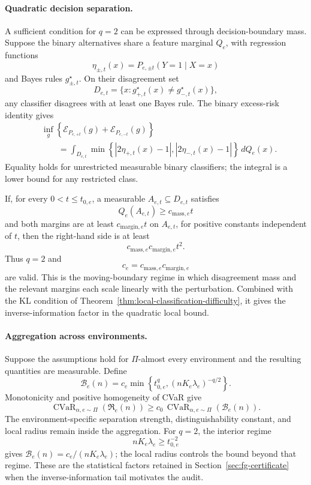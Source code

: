 \paragraph{Quadratic decision separation.}

A sufficient condition for \(q=2\) can be expressed through decision-boundary mass. Suppose the binary alternatives share a feature marginal \(Q_e\), with regression functions
\[
\eta_{\pm,t}(x)
=
P_{e,\pm t}(Y=1\mid X=x)
\]
and Bayes rules \(g_{\pm,t}^\star\). On their disagreement set
\[
D_{e,t}
=
\{x:g_{+,t}^\star(x)\ne g_{-,t}^\star(x)\},
\]
any classifier disagrees with at least one Bayes rule. The binary excess-risk identity gives
\[
\begin{aligned}
&\inf_g
\left\{
\mathcal E_{P_{e,+t}}(g)
+
\mathcal E_{P_{e,-t}}(g)
\right\}
\\
&\qquad=
\int_{D_{e,t}}
\min\left\{
|2\eta_{+,t}(x)-1|,
|2\eta_{-,t}(x)-1|
\right\}\,dQ_e(x).
\end{aligned}
\tag{A.21}\label{eq:app-boundary-separation}
\]
Equality holds for unrestricted measurable binary classifiers; the integral is a lower bound for any restricted class.

If, for every \(0<t\le t_{0,e}\), a measurable \(A_{e,t}\subseteq D_{e,t}\) satisfies
\[
Q_e(A_{e,t})\ge c_{\mathrm{mass},e}t
\]
and both margins are at least \(c_{\mathrm{margin},e}t\) on \(A_{e,t}\), for positive constants independent of \(t\), then the right-hand side is at least
\[
c_{\mathrm{mass},e}c_{\mathrm{margin},e}t^2.
\]
Thus \(q=2\) and
\[
c_e=c_{\mathrm{mass},e}c_{\mathrm{margin},e}
\]
are valid. This is the moving-boundary regime in which disagreement mass and the relevant margins each scale linearly with the perturbation. Combined with the KL condition of Theorem~\ref{thm:local-classification-difficulty}, it gives the inverse-information factor in the quadratic local bound.

\paragraph{Aggregation across environments.}

Suppose the assumptions hold for \(\Pi\)-almost every environment and the resulting quantities are measurable. Define
\[
\mathcal B_e(n)
=
c_e
\min\left\{
t_{0,e}^{q},
(nK_e\lambda_e)^{-q/2}
\right\}.
\tag{A.22}\label{eq:app-local-bound-factor}
\]
Monotonicity and positive homogeneity of CVaR give
\[
\operatorname{CVaR}_{\alpha,e\sim\Pi}
\!\left(\mathfrak R_e(n)\right)
\ge
c_0\,
\operatorname{CVaR}_{\alpha,e\sim\Pi}
\!\left(\mathcal B_e(n)\right).
\tag{A.23}\label{eq:app-tail-risk-aggregation}
\]
The environment-specific separation strength, distinguishability constant, and local radius remain inside the aggregation. For \(q=2\), the interior regime
\[
nK_e\lambda_e\ge t_{0,e}^{-2}
\]
gives \(\mathcal B_e(n)=c_e/(nK_e\lambda_e)\); the local radius controls the bound beyond that regime. These are the statistical factors retained in Section~\ref{sec:fg-certificate} when the inverse-information tail motivates the audit.

